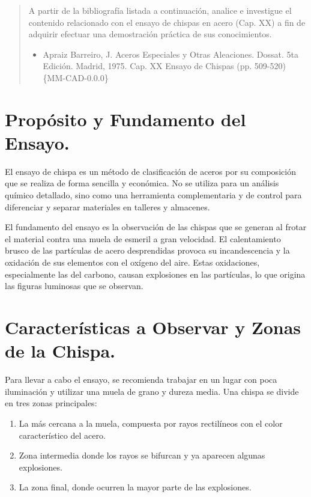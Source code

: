 \documentclass[12pt,a4paper]{article}
\begin{document}

\newpage
\tableofcontents

\begin{abstract}
    A partir de la bibliografía listada a continuación, analice e investigue el contenido relacionado con el ensayo de chispas en acero (Cap. XX) a fin de adquirir efectuar una demostración práctica de sus conocimientos.
    \begin{itemize}
        \item Apraiz Barreiro, J. Aceros Especiales y Otras Aleaciones. Dossat. 5ta Edición. Madrid, 1975. Cap. XX Ensayo de Chispas (pp. 509-520) \{MM-CAD-0.0.0\}
    \end{itemize}
\end{abstract}

\section{Propósito y Fundamento del Ensayo.}

El ensayo de chispa es un método de clasificación de aceros por su composición que se realiza de forma sencilla y económica. No se utiliza para un análisis químico detallado, sino como una herramienta complementaria y de control para diferenciar y separar materiales en talleres y almacenes.


El fundamento del ensayo es la observación de las chispas que se generan al frotar el material contra una muela de esmeril a gran velocidad. El calentamiento brusco de las partículas de acero desprendidas provoca su incandescencia y la oxidación de sus elementos con el oxígeno del aire. Estas oxidaciones, especialmente las del carbono, causan explosiones en las partículas, lo que origina las figuras luminosas que se observan.

\section{Características a Observar y Zonas de la Chispa.}

Para llevar a cabo el ensayo, se recomienda trabajar en un lugar con poca iluminación y utilizar una muela de grano y dureza media. Una chispa se divide en tres zonas principales:

\begin{enumerate}
    \item La más cercana a la muela, compuesta por rayos rectilíneos con el color característico del acero.
    \item Zona intermedia donde los rayos se bifurcan y ya aparecen algunas explosiones.
    \item La zona final, donde ocurren la mayor parte de las explosiones.
\end{enumerate}
\end{document}

